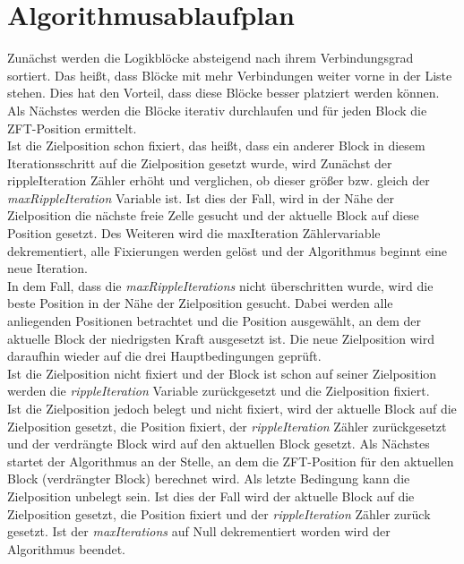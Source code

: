     \section{Algorithmusablaufplan}\label{sec:algo}
        Zunächst werden die Logikblöcke absteigend nach ihrem Verbindungsgrad sortiert.
        Das heißt, dass Blöcke mit mehr Verbindungen weiter vorne in der Liste stehen.
        Dies hat den Vorteil, dass diese Blöcke besser platziert werden können.
        Als Nächstes werden die Blöcke iterativ durchlaufen und für jeden Block die ZFT-Position ermittelt.
        \\
        Ist die Zielposition schon fixiert, das heißt, dass ein anderer Block in
        diesem Iterationsschritt auf die Zielposition gesetzt wurde, wird
        Zunächst der rippleIteration Zähler erhöht und verglichen,
        ob dieser größer bzw. gleich der \textit{maxRippleIteration} Variable ist.
        Ist dies der Fall, wird in der Nähe der Zielposition die nächste freie
        Zelle gesucht und der aktuelle Block auf diese Position gesetzt.
        Des Weiteren wird die maxIteration Zählervariable dekrementiert,
        alle Fixierungen werden gelöst und der Algorithmus beginnt eine neue Iteration. 
        \\
        In dem Fall, dass die \textit{maxRippleIterations} nicht überschritten wurde,
        wird die beste Position in der Nähe der Zielposition gesucht.
        Dabei werden alle anliegenden Positionen betrachtet und die Position ausgewählt,
        an dem der aktuelle Block der niedrigsten Kraft ausgesetzt ist.
        Die neue Zielposition wird daraufhin wieder auf die drei Hauptbedingungen geprüft.
        \\
        Ist die Zielposition nicht fixiert und der Block ist schon auf seiner Zielposition
        werden die \textit{rippleIteration} Variable zurückgesetzt und die Zielposition fixiert.
        \\
        Ist die Zielposition jedoch belegt und nicht fixiert, wird der aktuelle Block
        auf die Zielposition gesetzt, die Position fixiert, der \textit{rippleIteration} Zähler zurückgesetzt
        und der verdrängte Block wird auf den aktuellen Block gesetzt.
        Als Nächstes startet der Algorithmus an der Stelle, an dem die ZFT-Position für den
        aktuellen Block (verdrängter Block) berechnet wird.
        Als letzte Bedingung kann die Zielposition unbelegt sein.
        Ist dies der Fall wird der aktuelle Block auf die Zielposition gesetzt,
        die Position fixiert und der \textit{rippleIteration} Zähler zurück gesetzt.
        Ist der \textit{maxIterations} auf Null dekrementiert worden wird der Algorithmus beendet.

